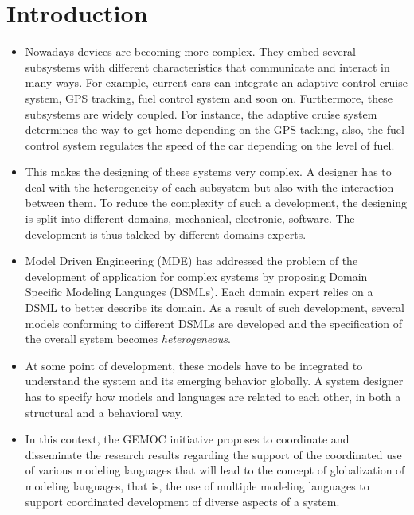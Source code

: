 \chapter{Introduction}


\begin{itemize}
	
	\item Nowadays devices are becoming more complex. They embed several subsystems with different characteristics that communicate and interact in many ways. For example, current cars can integrate an adaptive control cruise system, GPS tracking, fuel control system and soon on. Furthermore, these subsystems are widely coupled. For instance, the adaptive cruise system determines the way to get home depending on the GPS tacking, also, the fuel control system regulates the speed of the car depending on the level of fuel.
	
	\item This makes the designing of these systems very complex. A designer has to deal with the heterogeneity of each subsystem but also with the interaction between them. To reduce the complexity of such a development, the designing is split into different domains, \eg mechanical, electronic, software. The development is thus talcked by different domains experts.
	
	\item Model Driven Engineering (MDE) has addressed the problem of the development of application for complex systems by proposing Domain Specific Modeling Languages (DSMLs). Each domain expert relies on a DSML to better describe its domain. As a result of such development, several models conforming to different DSMLs are developed and the specification of the overall system becomes \emph{heterogeneous}.
	\item At some point of development, these models have to be integrated to understand the system and its emerging behavior globally. A system designer has to specify how models and languages are related to each other, in both a structural and a behavioral way.
	 
	\item In this context, the GEMOC initiative proposes to coordinate and disseminate the research results regarding the support of the coordinated use of various modeling languages that will lead to the concept of globalization of modeling languages, that is, the use of multiple modeling languages to support coordinated development of diverse aspects of a system. 
	

\end{itemize}
